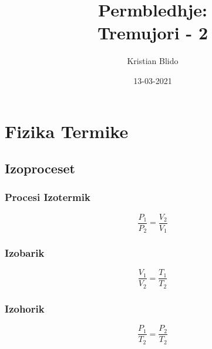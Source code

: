 \documentclass[12pt, a4paper, twocolumn]{article}
\title{Permbledhje: \\ Tremujori - 2}
\author{Kristian Blido}
\date{13-03-2021}
\begin{document}
\tableofcontents
\maketitle
\addtocounter{section}{8}
\section{Fizika Termike}
\subsection{Izoproceset}
\subsubsection{Procesi Izotermik}
 \[
\frac{P_{1}}{P_{2}} = \frac{V_{2}}{V_{1}}
\] 
\subsubsection{Izobarik}
\[
\frac{V_{1}}{V_{2}} = \frac{T_{1}}{T_{2}}
\] 
\subsubsection{Izohorik}
\[
\frac{P_{1}}{T_{2}} = \frac{P_{2}}{T_{2}}
\] 
\end{document}

